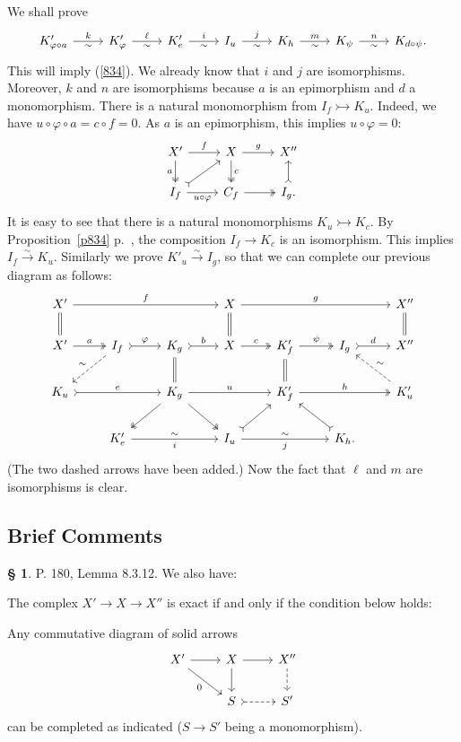 \documentclass[12pt]{article}
\theoremstyle{remark}
\theoremstyle{definition}
\newtheorem{s}[thm]{\S}
\newcommand{\pp}{\varphi}
\newcommand{\bc}{\subsection{Brief Comments}}
\newcommand{\mono}{\rightarrowtail}%
\newcommand{\xr}{\xrightarrow}
\begin{document}
We shall prove 
$$
\begin{tikzcd}
K'_{\varphi\circ a}\ar{r}{k}[swap]{\sim}&K'_\varphi\ar{r}{\ell}[swap]{\sim}&K'_e\ar{r}{i}[swap]{\sim}&I_u\ar{r}{j}[swap]{\sim}&K_h\ar{r}{m}[swap]{\sim}&K_\psi\ar{r}{n}[swap]{\sim}&K_{d\circ\psi}.
\end{tikzcd}
$$
This will imply (\ref{834}). We already know that $i$ and $j$ are isomorphisms. Moreover, $k$ and $n$ are isomorphisms because $a$ is an epimorphism and $d$ a monomorphism. There is a natural monomorphism from $I_f\mono K_u$. Indeed, we have $u\circ\pp\circ a=c\circ f=0$. As $a$ is an epimorphism, this implies $u\circ\pp=0$: 
$$
\begin{tikzcd}
X'\ar[two heads]{d}[swap]{a}\ar{r}{f}&X\ar[two heads]{d}{c}\ar{r}{g}&X''\\ 
I_f\ar[tail]{ru}\ar{r}[swap]{u\circ\pp}&C_f\ar[two heads]{r}&I_g.\ar[tail]{u}
\end{tikzcd}
$$
It is easy to see that there is a natural monomorphisms $K_u\mono K_c$. By Proposition~\ref{p834} p.~\pageref{p834}, the composition $I_f\to K_c$ is an isomorphism. This implies $I_f\xr\sim K_u$. Similarly we prove $K'_u\xr\sim I_g$, so that we can complete our previous diagram as follows: 
$$
\begin{tikzcd}
X'\ar{rrr}{f}\ar[equal]{d}&&&X\ar[equal]{d}\ar{rrr}{g}&&&X''\ar[equal]{d}\\ 
X'\ar[two heads]{r}{a}&I_f\ar[dashed]{dl}[swap]{\sim}\ar[tail]{r}{\varphi}&K_g\ar[equal]{d}\ar[tail]{r}{b}&X\ar[two heads]{r}{c}&K'_f\ar[equal]{d}\ar[two heads]{r}{\psi}&I_g\ar[tail]{r}{d}&X''\\ 
K_u\ar[tail]{rr}{e}&&K_g\ar[two heads]{dl}\ar[two heads]{dr}\ar{rr}{u}&&K'_f\ar[two heads]{rr}{h}&&K'_u\ar[dashed]{ul}[swap]{\sim}\\ 
&K'_e\ar{rr}{\sim}[swap]{i}&&I_u\ar[tail]{ur}\ar{rr}{\sim}[swap]{j}&&K_h.\ar[tail]{ul}
\end{tikzcd}
$$ 
(The two dashed arrows have been added.) Now the fact that $\ell$ and $m$ are isomorphisms is clear.
%
%
\bc
%
\begin{s}\label{8312}
P. 180, Lemma 8.3.12. We also have:

The complex $X'\to X\to X''$ is exact if and only if the condition below holds:

Any commutative diagram of solid arrows
$$
\begin{tikzcd}
X'\ar{dr}[swap]{0}\ar{r}&X\ar{d}\ar{r}&X''\ar[dashed]{d}\\ 
{}&S\ar[tail,dashed]{r}&S'
\end{tikzcd}
$$ 
can be completed as indicated ($S\to S'$ being a monomorphism).
\end{s}
\end{document}
